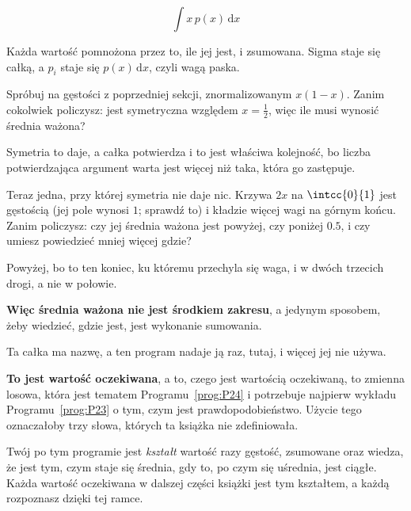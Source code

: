 \begin{fr}
\begin{ansblock}
\[ \int x\,p(x)\,\mathrm{d}x \]
\end{ansblock}

Każda wartość pomnożona przez to, ile jej jest, i zsumowana. Sigma staje się
całką, a $p_i$ staje się $p(x)\,\mathrm{d}x$, czyli wagą paska.

Spróbuj na gęstości z poprzedniej sekcji, znormalizowanym $x(1-x)$. Zanim
cokolwiek policzysz: jest symetryczna względem $x = \frac{1}{2}$, więc ile
musi wynosić średnia ważona?
\nextframe
\end{fr}

\begin{fr}
Symetria to daje, a całka potwierdza \dash{} i to jest właściwa kolejność, bo
liczba potwierdzająca argument warta jest więcej niż taka, która go zastępuje.

Teraz jedna, przy której symetria nie daje nic. Krzywa $2x$ na $\intcc{0}{1}$
jest gęstością (jej pole wynosi $1$; sprawdź to) i kładzie więcej wagi na
górnym końcu. Zanim policzysz: czy jej średnia ważona jest powyżej, czy
poniżej $\num{0.5}$, i czy umiesz powiedzieć mniej więcej gdzie?
\dotline
\nextframe
\end{fr}

\begin{fr}
Powyżej, bo to ten koniec, ku któremu przechyla się waga, i w dwóch trzecich
drogi, a nie w połowie.

\textbf{Więc średnia ważona nie jest środkiem zakresu}, a jedynym sposobem,
żeby wiedzieć, gdzie jest, jest wykonanie sumowania.

\end{fr}

\begin{fr}
Ta całka ma nazwę, a ten program nadaje ją raz, tutaj, i więcej jej nie
używa.

\textbf{To jest wartość oczekiwana}, a to, czego jest wartością oczekiwaną, to
zmienna losowa, która jest tematem Programu~\ref{prog:P24} i potrzebuje
najpierw wykładu Programu~\ref{prog:P23} o tym, czym jest prawdopodobieństwo.
Użycie tego oznaczałoby trzy słowa, których ta książka nie zdefiniowała.

Twój po tym programie jest \emph{kształt} \dash{} wartość razy gęstość,
zsumowane \dash{} oraz wiedza, że jest tym, czym staje się średnia, gdy to, po
czym się uśrednia, jest ciągłe. Każda wartość oczekiwana w dalszej części
książki jest tym kształtem, a każdą rozpoznasz dzięki tej ramce.
\end{fr}

